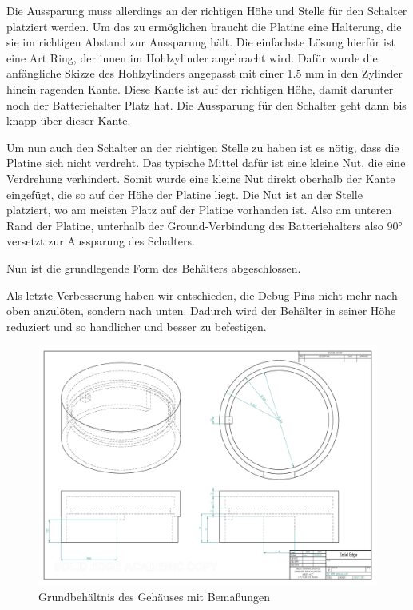 \documentclass[a4paper,
DIV=13,
12pt,
BCOR=10mm,
department=FakEI,
parskip=half,
automark,
]{article}
\begin{document}
Die Aussparung muss allerdings an der richtigen Höhe und Stelle für den Schalter platziert werden. Um das zu ermöglichen braucht die Platine eine Halterung, die sie im richtigen Abstand zur Aussparung hält. Die einfachste Lösung hierfür ist eine Art Ring, der innen im Hohlzylinder angebracht wird. Dafür wurde die anfängliche Skizze des Hohlzylinders angepasst mit einer 1.5 mm in den Zylinder hinein ragenden Kante. Diese Kante ist auf der richtigen Höhe, damit darunter noch der Batteriehalter Platz hat. Die Aussparung für den Schalter geht dann bis knapp über dieser Kante.

Um nun auch den Schalter an der richtigen Stelle zu haben ist es nötig, dass die Platine sich nicht verdreht. Das typische Mittel dafür ist eine kleine Nut, die eine Verdrehung verhindert. Somit wurde eine kleine Nut direkt oberhalb der Kante eingefügt, die so auf der Höhe der Platine liegt. Die Nut ist an der Stelle platziert, wo am meisten Platz auf der Platine vorhanden ist. Also am unteren Rand der Platine, unterhalb der Ground-Verbindung des Batteriehalters also 90° versetzt zur Aussparung des Schalters. 

Nun ist die grundlegende Form des Behälters abgeschlossen. 

Als letzte Verbesserung haben wir entschieden, die Debug-Pins nicht mehr nach oben anzulöten, sondern nach unten. Dadurch wird der Behälter in seiner Höhe reduziert und so handlicher und besser zu befestigen. 

\begin{figure}[!hbpt]
 \begin{center} \includegraphics[width=1.4\textwidth,angle=-90]{gehauuse_4.pdf}
 \caption{Grundbehältnis des Gehäuses mit Bemaßungen}
 \label{fig:Register}
  \end{center}
\end{figure}
\end{document}
